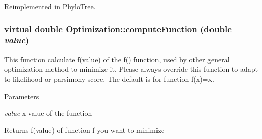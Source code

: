Reimplemented in \hyperlink{classPhyloTree_a9ae5f61aa0d22976b2d2e8f3ed15f44f}{PhyloTree}.\hypertarget{classOptimization_ad7ca7b884076f8c76312d516e23c6609}{
\subsubsection[{computeFunction}]{\setlength{\rightskip}{0pt plus 5cm}virtual double Optimization::computeFunction (double {\em value})}}
\label{classOptimization_ad7ca7b884076f8c76312d516e23c6609}
This function calculate f(value) of the f() function, used by other general optimization method to minimize it. Please always override this function to adapt to likelihood or parsimony score. The default is for function f(x)=x. 
\begin{DoxyParams}{Parameters}
\item[{\em value}]x-\/value of the function \end{DoxyParams}
\begin{DoxyReturn}{Returns}
f(value) of function f you want to minimize 
\end{DoxyReturn}


